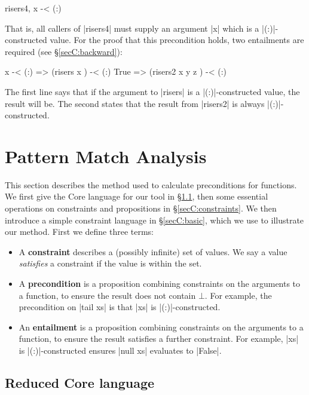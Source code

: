 \ignore\begin{code}
risers4, x -< (:)
\end{code}

\noindent That is, all callers of |risers4| must supply an argument |x| which is a |(:)|-constructed value. For the proof that this precondition holds, two entailments are required (see \S\ref{secC:backward}):

\ignore\begin{code}
x -< (:)  => (risers x       ) -< (:)
True      => (risers2 x y z  ) -< (:)
\end{code}

\noindent The first line says that if the argument to |risers| is a |(:)|-constructed value, the result will be. The second states that the result from |risers2| is always |(:)|-constructed.



\section{Pattern Match Analysis}
\label{secC:manipulate}

This section describes the method used to calculate preconditions for functions. We first give the Core language for our tool in \S\ref{secC:catch_core}, then some essential operations on constraints and propositions in \S\ref{secC:constraints}. We then introduce a simple constraint language in \S\ref{secC:basic}, which we use to illustrate our method. First we define three terms:

\begin{itemize}
\item A \textbf{constraint} describes a (possibly infinite) set of values. We say a value \textit{satisfies} a constraint if the value is within the set.
\item A \textbf{precondition} is a proposition combining constraints on the arguments to a function, to ensure the result does not contain $\bot{}$. For example, the precondition on |tail xs| is that |xs| is |(:)|-constructed.
\item An \textbf{entailment}  is a proposition combining constraints on the arguments to a function, to ensure the result satisfies a further constraint. For example, |xs| is |(:)|-constructed ensures |null xs| evaluates to |False|.
\end{itemize}

\subsection{Reduced Core language}
\label{secC:catch_core}

